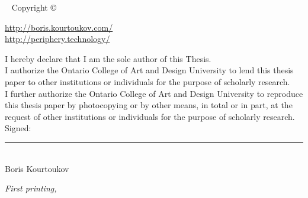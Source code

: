 
\blankpage

\newpage\thispagestyle{empty}
\openepigraph{%
}{}
\vfill
{}
\vfill
\openepigraph{%
}{}


\maketitle


\newpage
\begin{fullwidth}
~\vfill
\thispagestyle{empty}
\setlength{\parindent}{0pt}
\setlength{\parskip}{\baselineskip}
Copyright \copyright\ \the\year\ \thanklessauthor

\par{\url{http://boris.kourtoukov.com/}\\\url{http://periphery.technology/}}

\par I hereby declare that I am the sole author of this Thesis. \\
\vspace{1em}
I authorize the Ontario College of Art and Design University to lend this thesis paper to other institutions or individuals for the purpose of scholarly research. \\
\vspace{1em}
I further authorize the Ontario College of Art and Design University to reproduce this thesis paper by photocopying or by other means, in total or in part, at the request of other institutions or individuals for the purpose of scholarly research. \\

\vspace{2em}
Signed: \\
\hspace{3.5em}\noindent\rule{8cm}{0.5pt} \\
\hspace{3.5em}Boris Kourtoukov

\par\textit{First printing, \monthyear}
\end{fullwidth}

